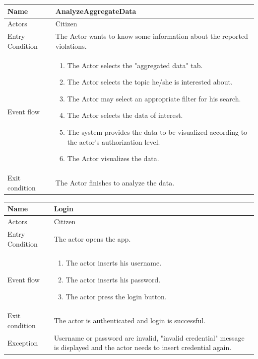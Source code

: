 \vskip 0.2in
\begin{tabular}{|p{3.7cm}|p{11cm}|}
\hline
Name & AnalyzeAggregateData\\
\hline
Actors & Citizen\\
\hline
Entry Condition & The Actor wants to know some information about the reported violations.\\
\hline
Event flow & \begin{enumerate}
                \item The Actor selects the "aggregated data" tab.
                \item The Actor selects the topic he/she is interested about.
                \item The Actor may select an appropriate filter for his search.
                \item The Actor selects the data of interest.
                \item The system provides the data to be visualized according to the actor's authorization level.
                \item The Actor visualizes the data.
            \end{enumerate}\\
\hline
Exit condition & The Actor finishes to analyze the data.\\
\hline
\end{tabular}

\vskip 0.2in
\begin{tabular}{|p{3.7cm}|p{11cm}|}
\hline
Name & Login\\
\hline
Actors & Citizen\\
\hline
Entry Condition & The actor opens the app.\\
\hline
Event flow & \begin{enumerate}
                \item The actor inserts his username.
                \item The actor inserts his password.
                \item The actor press the login button.
            \end{enumerate}\\
\hline
Exit condition & The actor is authenticated and login is successful.\\
\hline
Exception & Username or password are invalid, "invalid credential" message is displayed and the actor needs to insert credential again.\\
\hline
\end{tabular}

